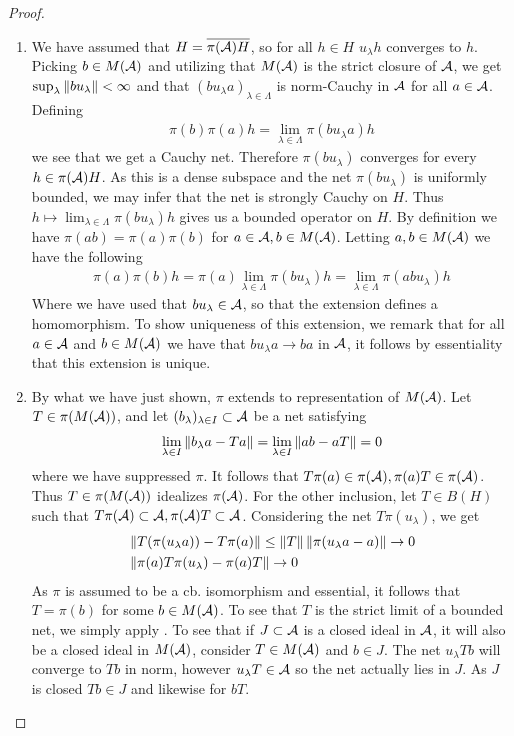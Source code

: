 \begin{proof}
	\begin{enumerate}
	\item
		We have assumed that $H=\overline{\pi(\mathcal{A})H}$, so for all $h\in H$ $u_\lambda h$ converges to $h$. Picking $b\in M(\mathcal{A})$ and utilizing that $M(\mathcal{A})$ is the strict closure of $\mathcal{A}$, we get $\sup_{\lambda}\left \Vert bu_\lambda \right \Vert<\infty$ and that $(bu_\lambda a)_{\lambda\in \Lambda}$ is norm-Cauchy in $\mathcal{A}$ for all $a\in \mathcal{A}$. Defining 
		\begin{align*}
			\pi(b)\pi(a)h=\lim_{\lambda \in \Lambda} \pi(bu_\lambda a)h
		\end{align*}
		we see that we get a Cauchy net. Therefore $\pi(bu_\lambda)$ converges for every $h\in \pi(\mathcal{A})H$. As this is a dense subspace and the net $\pi(bu_\lambda )$ is uniformly bounded, we may infer that the net is strongly Cauchy on $H$. Thus $h\mapsto \lim_{\lambda \in \Lambda} \pi(bu_\lambda)h$ gives us a bounded operator on $H$. 
		By definition we have $\pi(ab)=\pi(a)\pi(b)$ for $a\in \mathcal{A},b\in M(\mathcal{A})$. Letting $a,b\in M(\mathcal{A})$ we have the following
		\begin{align*}
			\pi(a)\pi(b)h=\pi(a)\lim_{\lambda \in \Lambda}\pi(bu_\lambda)h=\lim_{\lambda\in \Lambda} \pi(abu_\lambda)h
		\end{align*}
		Where we have used that $bu_\lambda \in \mathcal{A}$, so that the extension defines a homomorphism. 
		To show uniqueness of this extension, we remark that for all $a\in \mathcal{A}$ and $b\in M(\mathcal{A})$ we have that $bu_\lambda a\to ba$ in $\mathcal{A}$, it follows by essentiality that this extension is unique. 
	\item
		By what we have just shown, $\pi$ extends to representation of $M(\mathcal{A})$. Let $T\in \pi(M(\mathcal{A}))$, and let $(b_\lambda)_{\lambda \in I}\subset \mathcal{A}$ be a net satisfying 
		\begin{align*}
			\lim_{\lambda \in I}\left \Vert b_\lambda a-Ta \right \Vert=\lim_{\lambda \in I}\left \Vert ab-aT \right \Vert=0
		\end{align*}
		where we have suppressed $\pi$. It follows that $T\pi(a)\in \pi(\mathcal{A}),\pi(a)T\in \pi(\mathcal{A})$. Thus $T\in \pi(M(\mathcal{A}))$ idealizes $\pi(\mathcal{A})$. For the other inclusion, let $T\in B(H)$ such that $T\pi(\mathcal{A})\subset \mathcal{A},\pi(\mathcal{A})T\subset \mathcal{A}$. Considering the net $T\pi(u_\lambda)$, we get 
		\begin{align*}
			&\left \Vert T(\pi(u_\lambda a))-T\pi(a) \right \Vert\leq \left \Vert T \right \Vert\left \Vert \pi(u_\lambda a-a) \right \Vert\to 0 \\
			&\left \Vert \pi(a)T\pi(u_\lambda)-\pi(a)T \right \Vert\to 0
		\end{align*}
		As $\pi$ is assumed to be a cb. isomorphism and essential, it follows that $T=\pi(b)$ for some $b\in M(\mathcal{A})$. To see that $T$ is the strict limit of a bounded net, we simply apply . To see that if $J\subset \mathcal{A}$ is a closed ideal in $\mathcal{A}$, it will also be a closed ideal in $M(\mathcal{A})$, consider $T\in  M(\mathcal{A})$ and $b\in J$. The net $u_\lambda Tb$ will converge to $Tb$ in norm, however $u_\lambda T\in \mathcal{A}$ so the net actually lies in $J$. As $J$ is closed $Tb\in J$ and likewise for $bT$. 

\end{enumerate}
\end{proof}
